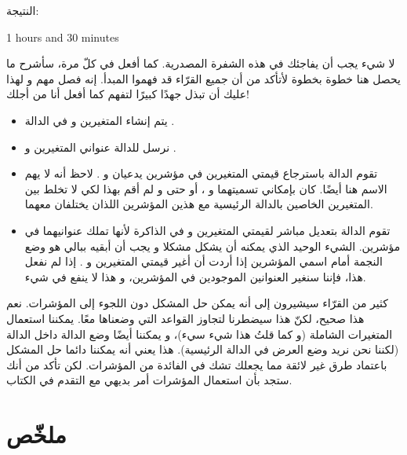 النتيجة:

\begin{Console}
1 hours and 30 minutes
\end{Console}

لا شيء يجب أن يفاجئك في هذه الشفرة المصدرية. كما أفعل في كلّ مرة، سأشرح ما يحصل هنا خطوة بخطوة لأتأكد من أن جميع القرّاء قد فهموا المبدأ. إنه فصل مهم و لهذا عليك أن تبذل جهدًا كبيرًا لتفهم كما أفعل أنا من أجلك!

\begin{itemize}
	\item يتم إنشاء المتغيرين
و
في الدالة
.
	\item نرسل للدالة
عنواني المتغيرين
و
.
	\item تقوم الدالة
باسترجاع قيمتي المتغيرين في مؤشرين يدعيان
و
.
لاحظ أنه لا يهم الاسم هنا أيضًا. كان بإمكاني تسميتهما
و
،
أو حتى
و
لم أقم بهذا لكي لا تخلط بين المتغيرين الخاصين بالدالة الرئيسية مع هذين المؤشرين اللذان يختلفان معهما.
	\item تقوم الدالة
بتعديل مباشر لقيمتي المتغيرين
و
في الذاكرة لأنها تملك عنوانيهما في مؤشرين. الشيء الوحيد الذي يمكنه أن يشكل مشكلا و يجب أن أبقيه ببالي هو وضع النجمة أمام اسمي المؤشرين إذا أردت أن أغير قيمتي المتغيرين
و
.
إذا لم نفعل هذا، فإننا سنغير العنوانين الموجودين في المؤشرين، و هذا لا ينفع في شيء.
\end{itemize}

\begin{information}
	كثير من القرّاء سيشيرون إلى أنه يمكن حل المشكل دون اللجوء إلى المؤشرات. نعم هذا صحيح، لكنّ هذا سيضطرنا لتجاوز القواعد التي وضعناها معًا. يمكننا استعمال المتغيرات الشاملة (و كما قلتُ هذا شيء سيء)، و يمكننا أيضًا وضع الدالة
داخل الدالة
(لكننا نحن نريد وضع العرض في الدالة الرئيسية). هذا يعني أنه يمكننا دائما حل المشكل باعتماد طرق غير لائقة مما يجعلك تشك في الفائدة من المؤشرات. لكن تأكد من أنك ستجد بأن استعمال المؤشرات أمر بديهي مع التقدم في الكتاب.
\end{information}

\section*{ملخّص}


